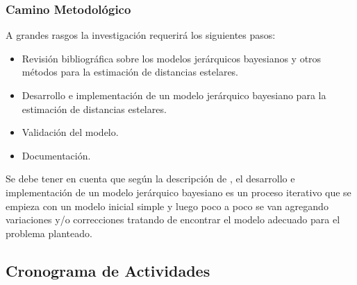 \documentclass[stu, 12pt, letterpaper, donotrepeattitle, floatsintext, natbib]{apa7_ula}
\begin{document}
\subsubsection{Camino Metodológico}

A grandes rasgos la investigación requerirá los siguientes pasos:

\begin{itemize}
    \item Revisión bibliográfica sobre los modelos jerárquicos bayesianos y otros métodos para la estimación de distancias estelares.
    \item Desarrollo e implementación de un modelo jerárquico bayesiano para la estimación de distancias estelares.
    \item Validación del modelo.
    \item Documentación.
\end{itemize}

Se debe tener en cuenta que según la descripción de
\citet{gelman2020bayesian}, el desarrollo e implementación de un
modelo jerárquico bayesiano es un proceso iterativo que se empieza
con un modelo inicial simple y luego poco a poco se van agregando
variaciones y/o correcciones tratando de encontrar el modelo
adecuado para el problema planteado.

\subsection{Cronograma de Actividades}
\end{document}
